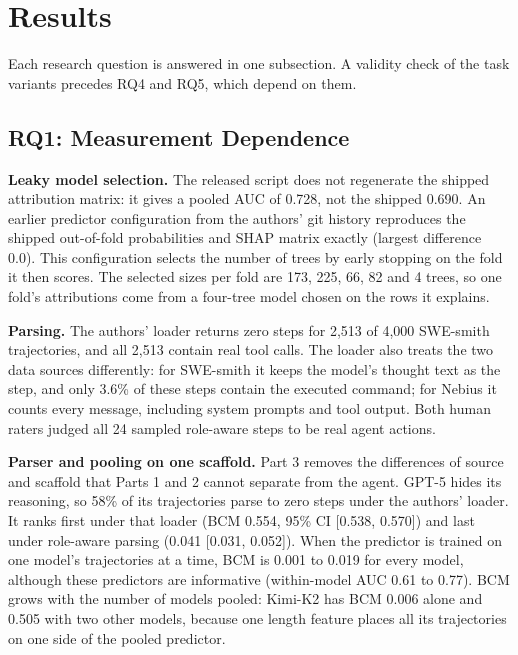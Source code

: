 \documentclass[conference]{IEEEtran}
\newcommand{\bcm}{\textsc{BCM}}
\begin{document}
\section{Results}
\label{sec:results}
Each research question is answered in one subsection. A validity check of the task variants precedes RQ4 and RQ5, which depend on them.

\subsection{RQ1: Measurement Dependence}
\label{sec:rq1}
\textbf{Leaky model selection.} The released script does not regenerate the shipped attribution matrix: it gives a pooled AUC of 0.728, not the shipped 0.690. An earlier predictor configuration from the authors' git history reproduces the shipped out-of-fold probabilities and SHAP matrix exactly (largest difference 0.0). This configuration selects the number of trees by early stopping on the fold it then scores. The selected sizes per fold are 173, 225, 66, 82 and 4 trees, so one fold's attributions come from a four-tree model chosen on the rows it explains.

\textbf{Parsing.} The authors' loader returns zero steps for 2{,}513 of 4{,}000 SWE-smith trajectories, and all 2{,}513 contain real tool calls. The loader also treats the two data sources differently: for SWE-smith it keeps the model's thought text as the step, and only 3.6\% of these steps contain the executed command; for Nebius it counts every message, including system prompts and tool output. Both human raters judged all 24 sampled role-aware steps to be real agent actions.

\textbf{Parser and pooling on one scaffold.} Part 3 removes the differences of source and scaffold that Parts 1 and 2 cannot separate from the agent. GPT-5 hides its reasoning, so 58\% of its trajectories parse to zero steps under the authors' loader. It ranks first under that loader (\bcm{} 0.554, 95\% CI [0.538, 0.570]) and last under role-aware parsing (0.041 [0.031, 0.052]). When the predictor is trained on one model's trajectories at a time, \bcm{} is 0.001 to 0.019 for every model, although these predictors are informative (within-model AUC 0.61 to 0.77). \bcm{} grows with the number of models pooled: Kimi-K2 has \bcm{} 0.006 alone and 0.505 with two other models, because one length feature places all its trajectories on one side of the pooled predictor.
\end{document}
